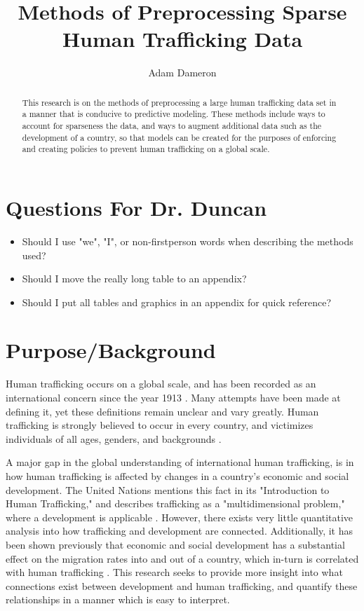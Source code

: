 \documentclass{article} %
\title{Methods of Preprocessing Sparse Human Trafficking Data}
\author{
	Adam Dameron
}
\begin{document}
	
	
	\maketitle
	
	\begin{abstract}
		This research is on the methods of preprocessing a large human trafficking data set in a manner that is conducive to predictive modeling. These methods include ways to account for sparseness the data, and ways to augment additional data such as the development of a country, so that models can be created for the purposes of enforcing and creating policies to prevent human trafficking on a global scale.
	\end{abstract}
	
	\section*{Questions For Dr. Duncan}
	\begin{itemize}
		\item Should I use "we", "I", or non-firstperson words when describing the methods used?
		\item Should I move the really long table to an appendix?
		\item Should I put all tables and graphics in an appendix for quick reference?
	\end{itemize}
	
\section{Purpose/Background}
	

Human trafficking occurs on a global scale, and has been recorded as an international concern since the year 1913 \parencite{Aromaa2007}. Many attempts have been made at defining it, yet these definitions remain unclear and vary greatly. Human trafficking is strongly believed to occur in every country, and victimizes individuals of all ages, genders, and backgrounds \parencite{JacK2012}.\medskip

A major gap in the global understanding of international human trafficking, is in how human trafficking is affected by changes in a country's economic and social development. The United Nations mentions this fact in its "Introduction to Human Trafficking," and describes trafficking as a "multidimensional problem," where a development is applicable \parencite{kangaspunta_2008}. However, there exists very little quantitative analysis into how trafficking and development are connected. Additionally, it has been shown previously that economic and social development has a substantial effect on the migration rates into and out of a country, which in-turn is correlated with human trafficking \parencite{USEconPower, EastEurope}. This research seeks to provide more insight into what connections exist between development and human trafficking, and quantify these relationships in a manner which is easy to interpret.
\end{document}
